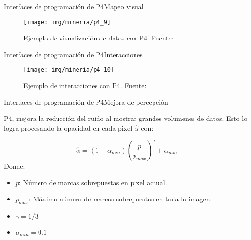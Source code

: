 \documentclass[10pt]{beamer}
\newcommand{\1}{
        	\setbeamertemplate{background}{
        		\texttt{[image: img/1]}
        		\tikz[overlay] \fill[fill opacity=0.75,fill=white] (0,0) rectangle (-\paperwidth,\paperheight);
        	}
}
\begin{document}
\begin{frame}{Interfaces de programación de P4}{Mapeo visual}
	\begin{figure}[]
		\centering
		\texttt{[image: img/mineria/p4\_9]}
		\caption{Ejemplo de visualización de datos con P4. Fuente: \cite{li2018p4}}
	\end{figure}
\end{frame}


\begin{frame}{Interfaces de programación de P4}{Interacciones}
	\begin{figure}[]
		\centering
		\texttt{[image: img/mineria/p4\_10]}
		\caption{Ejemplo de interacciones con P4. Fuente: \cite{li2018p4}}
	\end{figure}
\end{frame}



\begin{frame}{Interfaces de programación de P4}{Mejora de percepción}
	\begin{block}{}
		P4, mejora la reducción del ruido al mostrar grandes volumenes de datos. Esto lo logra procesando la opacidad en cada pixel $\hat{\alpha}$ con:
		
		\[
				\hat{\alpha} = (1 - \alpha_{min})( \frac{p}{p_{max}} )^\gamma + \alpha_{min}
		\]
		Donde: \\
		\begin{itemize}
			\item $p$: Número de marcas sobrepuestas en pixel actual.
			\item $p_{max}$: Máximo número de marcas sobrepuestas en toda la imagen.
			\item $\gamma = 1/3$
			\item $\alpha_{min} = 0.1$
			
		\end{itemize}
		
	\end{block}
\end{frame}
\end{document}
